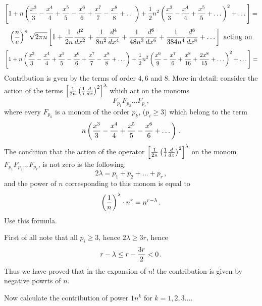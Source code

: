        $$
  \left[
   1+
 n\left(
    {x^3\over 3}
     -
   {x^4\over 4}
     +
 {x^5\over 5}
     -
 {x^6\over 6}
     +
 {x^7\over 7}
     -
 {x^8\over 8}
     +
    \dots
    \right)
    +
     {1\over 2}n^2
 \left(
    {x^3\over 3}
     -
   {x^4\over 4}
     +
 {x^5\over 5}
      +\dots
    \right)^2
      +\dots
   \right]=
       $$
        $$
\left(n\over e\right)^n\sqrt {2\pi n}
\left[1
       +
      {1\over 2n}
    {d^2\over dx^2}
     +
  {1\over 8n^2}
    {d^4\over dx^4}
        +
  {1\over 48n^3}
   {d^6\over dx^6}
        +
   {1\over 384n^4}
   {d^8\over dx^8}
         +\dots
\right]\,\,
 \hbox {acting on}
     $$
       $$
  \left[
   1+
 n\left(
    {x^3\over 3}
     -
   {x^4\over 4}
     +
 {x^5\over 5}
     -
 {x^6\over 6}
     +
 {x^7\over 7}
     -
 {x^8\over 8}
     +
    \dots
    \right)
    +
     {1\over 2}n^2
 \left(
    {x^6\over 9}
     -
   {x^7\over 6}
     +
 {x^8\over 16}
    +
 {2x^8\over 15}
      +\dots
    \right)^2
      +\dots
   \right]
      =
       $$
Contribution is gven by the terms of order
   $4,6$ and $8$. More in detail:
  consider  the action of the terms
   $\left[
  {1\over 2n}\left({1\over i}{d\over dx}\right)^2
    \right]^\lambda$
which act on the monoms
     $$
     F_{p_1}F_{p_2}\dots F_{p_r},
     $$
 where every $F_{p_k}$ is a monom of the order $p_k$,
  ($p_i\geq 3$)  which belong to  the term
     $$
   n\left(
   {x^3\over 3}
    -
   {x^4\over 4}
     +
  {x^5\over 5}
    -
   {x^6\over 6}
    +\dots
   \right)\,.
    $$
The condition that the action
of the operator 
   $\left[
  {1\over 2n}\left({1\over i}{d\over dx}\right)^2
    \right]^\lambda$
on the monom 
$F_{p_1}F_{p_2}\dots F_{p_r}$,
is not zero is the following:
    $$
   2\lambda=p_1+p_2+\dots+p_r\,,
     $$
and the power of $n$ corresponding to this monom is
equal to 
      $$
\left({1\over n}\right)^\lambda \cdot 
   n^r=n^{r-\lambda}\,.
       $$
Use this formula.

First of all note that all $p_i\geq 3$, hence
 $2\lambda\geq 3r$, hence
 $$
r-\lambda\leq r-{3r\over 2}<0\,.
 $$
Thus we have proved that in the expansion of $n!$  the
contribution is given by negative powrts of $n$.
 

Now calculate the contribution of power ${1n^k}$
for $k=1,2,3\dots$.

